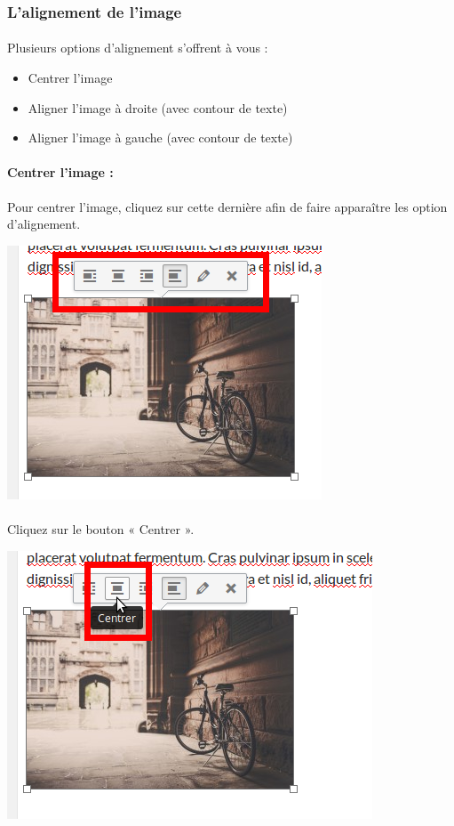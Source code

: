 \documentclass[10pt,a4paper]{article}
\begin{document}
\subsubsection{L'alignement de l'image}
\paragraph{}Plusieurs options d'alignement s'offrent à vous :
\begin{itemize}
\item Centrer l'image
\item Aligner l'image à droite (avec contour de texte)
\item Aligner l'image à gauche (avec contour de texte)
\end{itemize}
\paragraph{Centrer l'image : }Pour centrer l'image, cliquez sur cette dernière afin de faire apparaître les option d'alignement.
\begin{center}
\includegraphics[scale=0.3]{img/0107.png}
\end{center}
\paragraph{}Cliquez sur le bouton « Centrer ».
\begin{center}
\includegraphics[scale=0.3]{img/0108.png}
\end{center}
\end{document}
